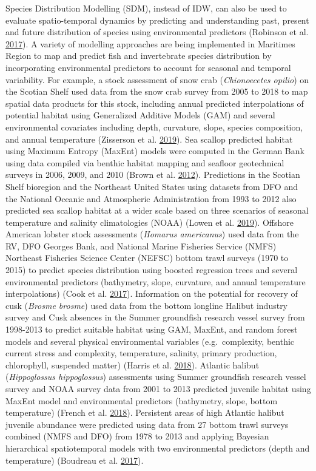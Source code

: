 \documentclass[12pt]{article}\usepackage[]{graphicx}\usepackage[]{color}
\begin{document}
Species Distribution Modelling (SDM), instead of IDW, can also be used to evaluate spatio-temporal dynamics by predicting and understanding past, present and future distribution of species using environmental predictors (Robinson et al. \protect\hyperlink{ref-Robinson:2017}{2017}). A variety of modelling approaches are being implemented in Maritimes Region to map and predict fish and invertebrate species distribution by incorporating environmental predictors to account for seasonal and temporal variability. For example, a stock assessment of snow crab (\emph{Chionoecetes opilio}) on the Scotian Shelf used data from the snow crab survey from 2005 to 2018 to map spatial data products for this stock, including annual predicted interpolations of potential habitat using Generalized Additive Models (GAM) and several environmental covariates including depth, curvature, slope, species composition, and annual temperature (Zisserson et al. \protect\hyperlink{ref-Zisserson2019}{2019}). Sea scallop predicted habitat using Maximum Entropy (MaxEnt) models were computed in the German Bank using data compiled via benthic habitat mapping and seafloor geotechnical surveys in 2006, 2009, and 2010 (Brown et al. \protect\hyperlink{ref-Brown:2012}{2012}). Predictions in the Scotian Shelf bioregion and the Northeast United States using datasets from DFO and the National Oceanic and Atmospheric Administration from 1993 to 2012 also predicted sea scallop habitat at a wider scale based on three scenarios of seasonal temperature and salinity climatologies (NOAA) (Lowen et al. \protect\hyperlink{ref-Lowen:2019}{2019}). Offshore American lobster stock assessments (\emph{Homarus americanus}) used data from the RV, DFO Georges Bank, and National Marine Fisheries Service (NMFS) Northeast Fisheries Science Center (NEFSC) bottom trawl surveys (1970 to 2015) to predict species distribution using boosted regression trees and several environmental predictors (bathymetry, slope, curvature, and annual temperature interpolations) (Cook et al. \protect\hyperlink{ref-Cook:2017}{2017}). Information on the potential for recovery of cusk (\emph{Brosme brosme}) used data from the bottom longline Halibut industry survey and Cusk absences in the Summer groundfish research vessel survey from 1998-2013 to predict suitable habitat using GAM, MaxEnt, and random forest models and several physical environmental variables (e.g.~complexity, benthic current stress and complexity, temperature, salinity, primary production, chlorophyll, suspended matter) (Harris et al. \protect\hyperlink{ref-Harris:2018}{2018}). Atlantic halibut (\emph{Hippoglossus hippoglossus}) assessments using Summer groundfish research vessel survey and NOAA survey data from 2001 to 2013 predicted juvenile habitat using MaxEnt model and environmental predictors (bathymetry, slope, bottom temperature) (French et al. \protect\hyperlink{ref-French:2018}{2018}). Persistent areas of high Atlantic halibut juvenile abundance were predicted using data from 27 bottom trawl surveys combined (NMFS and DFO) from 1978 to 2013 and applying Bayesian hierarchical spatiotemporal models with two environmental predictors (depth and temperature) (Boudreau et al. \protect\hyperlink{ref-Boudreau:2017}{2017}).
\end{document}
